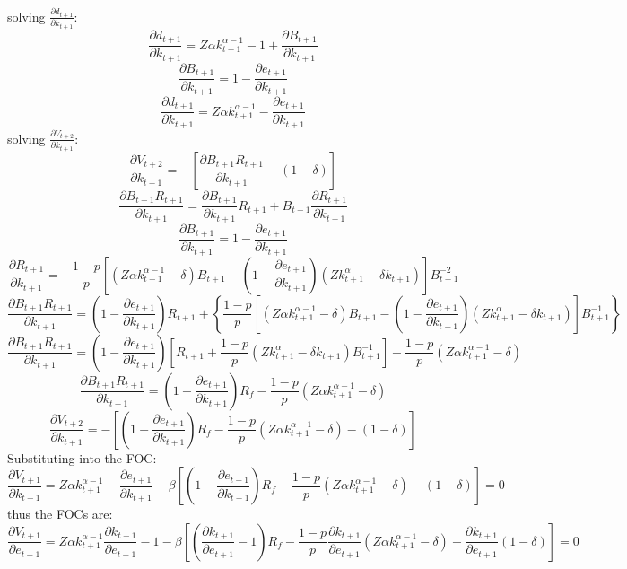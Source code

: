 \documentclass{article}
\begin{document}
solving \(\frac{\partial d_{t+1}}{\partial k_{t+1}}\):
\[\frac{\partial d_{t+1}}{\partial k_{t+1}} = Z \alpha k_{t+1} ^{\alpha-1} - 1 + \frac{\partial B_{t+1}}{\partial
k_{t+1}} \]
\[\frac{\partial B_{t+1}}{\partial
k_{t+1}} = 1 - \frac{\partial e_{t+1}}{\partial k_{t+1}} \]
\[\frac{\partial d_{t+1}}{\partial k_{t+1}} = Z \alpha k_{t+1} ^{\alpha-1} - \frac{\partial e_{t+1}}{\partial
k_{t+1}}\]
solving \(\frac{\partial V_{t+2}}{\partial k_{t+1}}\):
\[\frac{\partial V_{t+2}}{\partial k_{t+1}} = -\left[\frac{\partial B_{t+1}R_{t+1}}{\partial k_{t+1}} -(1-\delta)\right] \]
\[\frac{\partial B_{t+1}R_{t+1}}{\partial k_{t+1}} = \frac{\partial B_{t+1}}{\partial k_{t+1}}R_{t+1} +
B_{t+1}\frac{\partial R_{t+1}}{\partial k_{t+1}}\]
\[\frac{\partial B_{t+1}}{\partial k_{t+1}} = 1-\frac{\partial e_{t+1}}{\partial k_{t+1}} \]
\[\frac{\partial R_{t+1}}{\partial k_{t+1}} =  - \frac{1-p}{p}\left[\left(Z\alpha k^{\alpha-1}_{t+1}-\delta\right)B_{t+1} -
\left(1-\frac{\partial e_{t+1}}{\partial k_{t+1}}\right)\left(Zk_{t+1}^{\alpha} - \delta k_{t+1}
\right)\right]B_{t+1}^{-2} 
\]
\[\frac{\partial B_{t+1}R_{t+1}}{\partial k_{t+1}} = \left(1-\frac{\partial e_{t+1}}{\partial k_{t+1}}\right) R_{t+1} +
\left\{\frac{1-p}{p}\left[(Z \alpha k^{\alpha-1}_{t+1}-\delta)B_{t+1} -
\left(1-\frac{\partial e_{t+1}}{\partial k_{t+1}}\right)\left(Zk_{t+1}^{\alpha} - \delta k_{t+1}
\right)\right]B_{t+1}^{-1} \right\}\]
\[\frac{\partial B_{t+1}R_{t+1}}{\partial k_{t+1}} =\left(1-\frac{\partial e_{t+1}}{\partial k_{t+1}}\right)
\left[R_{t+1} + \frac{1-p}{p}\left(Z k_{t+1}^{\alpha} - \delta k_{t+1}\right)B_{t+1}^{-1}\right]-
\frac{1-p}{p}\left(Z\alpha k^{\alpha-1}_{t+1}-\delta\right) \]
\[\frac{\partial B_{t+1}R_{t+1}}{\partial k_{t+1}} =\left(1-\frac{\partial e_{t+1}}{\partial k_{t+1}}\right)
R_f - \frac{1-p}{p}\left(Z\alpha k^{\alpha-1}_{t+1}-\delta\right) \]
\[\frac{\partial V_{t+2}}{\partial k_{t+1}} = -\left[\left(1-\frac{\partial e_{t+1}}{\partial k_{t+1}}\right)
R_f - \frac{1-p}{p}\left(Z\alpha k^{\alpha-1}_{t+1}-\delta\right)- \left(1-\delta\right)\right] \]
Substituting into the FOC:
\[\frac{\partial V_{t+1}}{\partial k_{t+1}} =Z \alpha k_{t+1} ^{\alpha-1} - \frac{\partial e_{t+1}}{\partial
k_{t+1}} - \beta \left[\left(1-\frac{\partial e_{t+1}}{\partial k_{t+1}}\right)
R_f - \frac{1-p}{p}\left(Z\alpha k^{\alpha-1}_{t+1}-\delta\right)- \left(1-\delta\right)\right]=0\]
thus the FOCs are:
\[\frac{\partial V_{t+1}}{\partial e_{t+1}} = Z \alpha k_{t+1} ^{\alpha-1}\frac{\partial k_{t+1}}{\partial e_{t+1}}  - 1 - \beta 
\left[\left(\frac{\partial k_{t+1}}{\partial e_{t+1}} -1 
\right)R_f-
\frac{1-p}{p}\frac{\partial k_{t+1}}{\partial e_{t+1}} \left(Z\alpha k^{\alpha-1}_{t+1} - \delta\right) - \frac{\partial
k_{t+1}}{\partial e_{t+1}} \left( 1-\delta \right)\right] = 0\]
\end{document}
